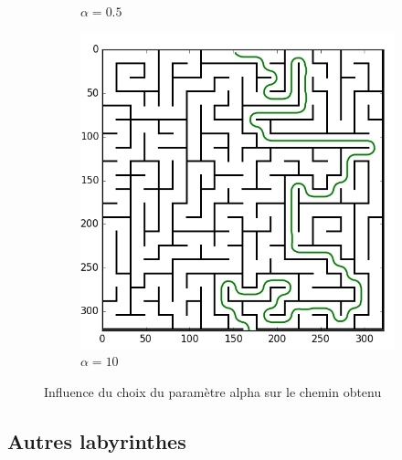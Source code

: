 \documentclass{article}
\begin{document}
\begin{figure}
\begin{subfigure}[b]{0.3\textwidth}
		\caption{$\alpha=0.5$}
		\label{fig:three sin x}
	\end{subfigure}
	\hfill
	\begin{subfigure}[b]{0.3\textwidth}
		\centering
		\includegraphics[width=\textwidth]{../result/maze_C10.png}
		\caption{$\alpha=10$}
		\label{fig:five over x}
	\end{subfigure}
	\caption{Influence du choix du paramètre alpha sur le chemin obtenu}
	\label{fig:comp_alpha}
\end{figure}

\subsection{Autres labyrinthes}
\end{document}
